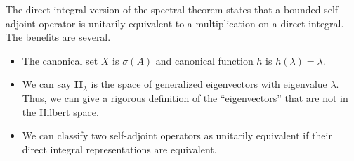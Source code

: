 \documentclass[12pt]{extarticle}
\theoremstyle{plain}
\theoremstyle{definition}
\theoremstyle{remark}
\begin{document}
  The direct integral version of the spectral theorem states that a bounded self-adjoint operator is unitarily equivalent to a multiplication on a direct integral. The benefits are several.
  \begin{itemize}
    \item The canonical set $X$ is $\sigma(A)$ and canonical function $h$ is $h(\lambda) = \lambda$.
    \item We can say $\mathbf{H}_{\lambda}$ is the space of generalized eigenvectors with eigenvalue $\lambda$. Thus, we can give a rigorous definition of the ``eigenvectors'' that are not in the Hilbert space.
    \item We can classify two self-adjoint operators as unitarily equivalent if their direct integral representations are equivalent.
  \end{itemize}
\end{document}
